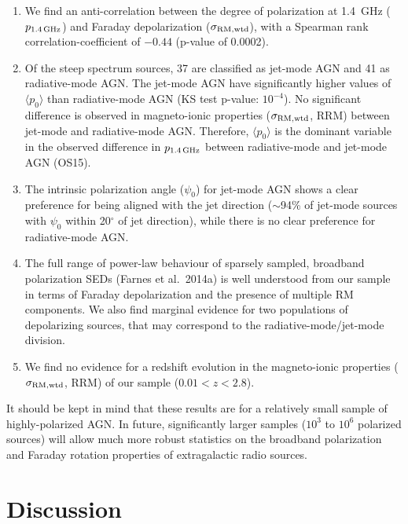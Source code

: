\documentclass{mnras}
\newcommand*\sigmaRMwtd{\sigma_{\rm RM, wtd}}
\begin{document}
\begin{enumerate}
 \item We find an anti-correlation between the degree of polarization at 1.4~GHz ($p_{\rm 1.4\,GHz}$) and Faraday depolarization ($\sigmaRMwtd$), with a Spearman rank correlation-coefficient of $-0.44$ (p-value of 0.0002). 
 \item Of the steep spectrum sources, 37 are classified as jet-mode AGN and 41 as radiative-mode AGN. The jet-mode AGN have significantly higher values of $\langle p_0 \rangle$ than radiative-mode AGN (KS test p-value: $10^{-4}$). No significant difference is observed in magneto-ionic properties ($\sigmaRMwtd$, RRM) between jet-mode and radiative-mode AGN. Therefore, $\langle p_0 \rangle$ is the dominant variable in the observed difference in $p_{\rm 1.4\,GHz}$ between radiative-mode and jet-mode AGN (OS15). 
 \item The intrinsic polarization angle ($\psi_0$) for jet-mode AGN shows a clear preference for being aligned with the jet direction ($\sim$94\% of jet-mode sources with $\psi_0$ within 20$^\circ$ of jet direction), while there is no clear preference for radiative-mode AGN. 
 \item The full range of power-law behaviour of sparsely sampled, broadband polarization SEDs (Farnes et al.~2014a) is well understood from our sample in terms of Faraday depolarization and the presence of multiple RM components. We also find marginal evidence for two populations of depolarizing sources, that may correspond to the radiative-mode/jet-mode division. 
 \item We find no evidence for a redshift evolution in the magneto-ionic properties ($\sigmaRMwtd$, RRM) of our sample ($0.01 < z < 2.8$).
\end{enumerate}
It should be kept in mind that these results are for a relatively small sample of highly-polarized AGN. In future, significantly larger samples ($10^3$ to $10^6$ polarized sources) will allow much more robust statistics on the broadband polarization and Faraday rotation properties of extragalactic radio sources. 


\section{Discussion}
\end{document}
